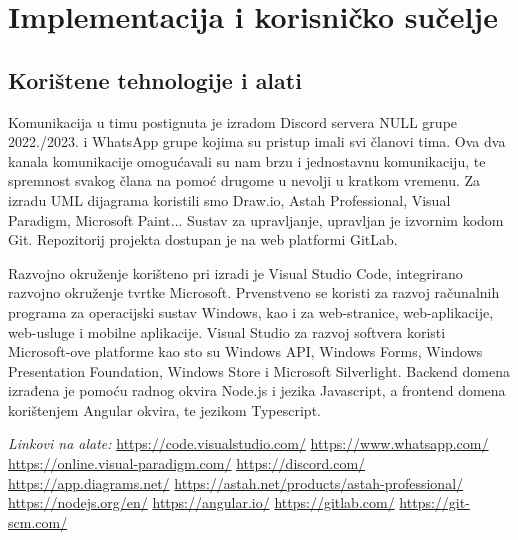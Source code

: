 \chapter{Implementacija i korisničko sučelje}
		
		
		\section{Korištene tehnologije i alati}
		
		    \texttt{}{
               Komunikacija u timu postignuta je izradom Discord servera NULL grupe 2022./2023. i WhatsApp grupe kojima su pristup imali svi članovi tima. Ova dva kanala komunikacije omogućavali su nam brzu i jednostavnu komunikaciju, te spremnost svakog člana na pomoć drugome u nevolji u kratkom vremenu. Za izradu UML dijagrama koristili smo Draw.io, Astah Professional, Visual Paradigm, Microsoft Paint... Sustav za upravljanje, upravljan je izvornim kodom Git. Repozitorij projekta dostupan je na web platformi GitLab. 

               Razvojno okruženje korišteno pri izradi je Visual Studio Code, integrirano razvojno okruženje tvrtke Microsoft. Prvenstveno se koristi za razvoj računalnih programa za operacijski sustav Windows, kao i za web-stranice, web-aplikacije, web-usluge i mobilne aplikacije. Visual Studio za razvoj softvera koristi Microsoft-ove platforme kao sto su Windows API, Windows Forms, Windows Presentation Foundation, Windows Store i Microsoft Silverlight. Backend domena izrađena je pomoću radnog okvira Node.js i jezika Javascript, a frontend domena korištenjem Angular okvira, te jezikom Typescript. 

              

              
            }

            
             \textit{Linkovi na alate:}
            \newline
             \url{https://code.visualstudio.com/}
             \newline
             \url{https://www.whatsapp.com/}
             \newline
             \url{https://online.visual-paradigm.com/}
             \newline
             \url{https://discord.com/}
             \newline
             \url{https://app.diagrams.net/}
             \newline
             \url{https://astah.net/products/astah-professional/}
             \newline
             \url{https://nodejs.org/en/}
             \newline
             \url{https://angular.io/}
             \newline
             \url{https://gitlab.com/}
             \newline
             \url{https://git-scm.com/}
             
